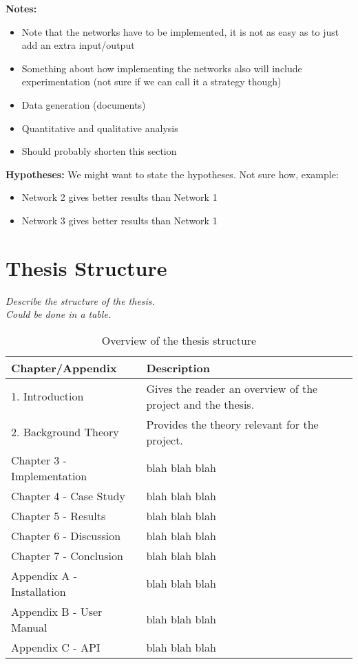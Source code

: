 \noindent\textbf{Notes:}
\begin{itemize}
    \item Note that the networks have to be implemented, it is not as easy as to just add an extra input/output
    \item Something about how implementing the networks also will include experimentation (not sure if we can call it a strategy though)
    \item Data generation (documents)
    \item Quantitative and qualitative analysis
    \item Should probably shorten this section
\end{itemize}

\noindent\textbf{Hypotheses:} We might want to state the hypotheses. Not sure how, example:
\begin{itemize}
    \item Network 2 gives better results than Network 1
    \item Network 3 gives better results than Network 1
\end{itemize}

\section{Thesis Structure}

\textit{Describe the structure of the thesis. \\
Could be done in a table.}

\begin{table}[!h]
\begin{center}
\begin{tabular}{ | l | l |}
\hline
\textbf{Chapter/Appendix} & \textbf{Description} \\ \hline
1. Introduction & Gives the reader an overview of the project and the thesis. \\ \hline
2. Background Theory & Provides the theory relevant for the project. \\ \hline
Chapter 3 - Implementation & blah blah blah \\ \hline
Chapter 4 - Case Study & blah blah blah \\ \hline
Chapter 5 - Results & blah blah blah \\ \hline
Chapter 6 - Discussion & blah blah blah \\ \hline
Chapter 7 - Conclusion & blah blah blah \\ \hline
Appendix A - Installation & blah blah blah \\ \hline
Appendix B - User Manual & blah blah blah \\ \hline
Appendix C - API & blah blah blah \\ \hline
\end{tabular}
\end{center}
\caption{Overview of the thesis structure}
\label{Tab1}
\end{table}

\cleardoublepage